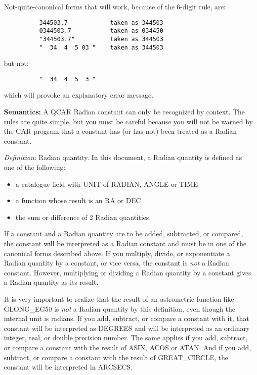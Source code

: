 Not-quite-canonical forms that will work, because of the 6-digit rule, are:
\begin{verbatim}
          344503.7            taken as 344503
          0344503.7           taken as 034450
          "344503.7"          taken as 344503
          "  34  4  5 03 "    taken as 344503
\end{verbatim}
but not:
\begin{verbatim}
          "  34  4  5  3 "
\end{verbatim}
which will provoke an explanatory error message.

{\bf Semantics:} A QCAR Radian constant can only be recognized by context.
The rules are quite simple, but you must be careful because you will not be
warned by the CAR program that a constant has (or has not) been treated as a
Radian constant.

{\em Definition:} Radian quantity.
In this document, a Radian quantity is defined as one of the following:
\begin{itemize}
\item a catalogue field with UNIT of RADIAN, ANGLE or TIME
\item a function whose result is an RA or DEC
\item the sum or difference of 2 Radian quantities
\end{itemize}
If a constant and a Radian quantity are to be added, subtracted, or compared,
the constant will be interpreted as a Radian constant and must be in one of the
canonical forms described above.
If you multiply, divide, or exponentiate a Radian quantity by a constant, or
vice versa, the constant is {\em not} a Radian constant.
However, multiplying or dividing a Radian quantity by a constant gives a
Radian quantity as its result.

It is very important to realize that the result of an astrometric function like
GLONG\_EG50 is {\em not} a Radian quantity by this definition, even though the
internal unit is radians.
If you add, subtract, or compare a constant with it, that constant will be
interpreted as DEGREES and will be interpreted as an ordinary integer, real, or
double precision number.
The same applies if you add, subtract, or compare a constant with the result of
ASIN, ACOS or ATAN.
And if you add, subtract, or compare a constant with the result of
GREAT\_CIRCLE, the constant will be interpreted in ARCSECS.

